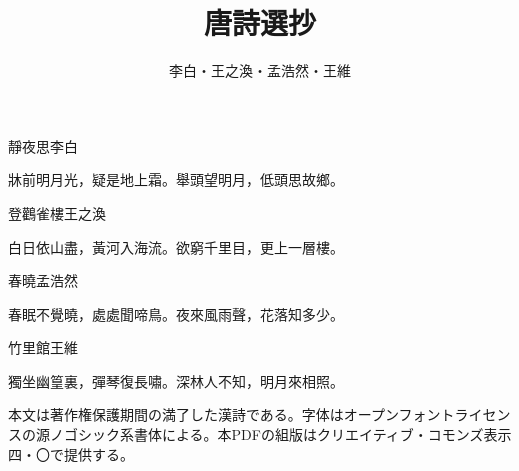 \documentclass[tate,book,paper=a4]{jlreq}
\title{唐詩選抄}
\author{李白・王之渙・孟浩然・王維}
\begin{document}
\maketitle
靜夜思李白\par
牀前明月光，疑是地上霜。舉頭望明月，低頭思故鄉。\par
登鸛雀樓王之渙\par
白日依山盡，黃河入海流。欲窮千里目，更上一層樓。\par
春曉孟浩然\par
春眠不覺曉，處處聞啼鳥。夜來風雨聲，花落知多少。\par
竹里館王維\par
獨坐幽篁裏，彈琴復長嘯。深林人不知，明月來相照。\par
本文は著作権保護期間の満了した漢詩である。字体はオープンフォントライセンスの源ノゴシック系書体による。本PDFの組版はクリエイティブ・コモンズ表示四・〇で提供する。\par
\end{document}
